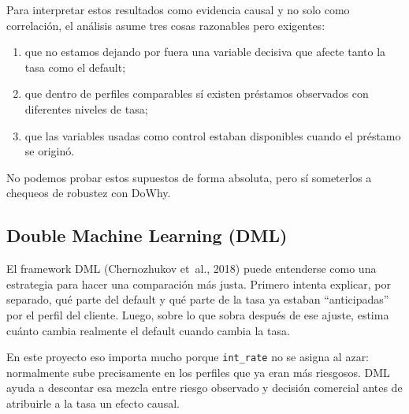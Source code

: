 \documentclass[
  spanish,
  11pt,
  letterpaper,
]{scrbook}
\providecommand{\tightlist}{%
  \setlength{\itemsep}{0pt}\setlength{\parskip}{0pt}}
\theoremstyle{plain}
\theoremstyle{remark}
\begin{document}
\begin{tcolorbox}[enhanced jigsaw, arc=.35mm, bottomrule=.15mm, bottomtitle=1mm, breakable, colback=white, colbacktitle=quarto-callout-note-color!10!white, colframe=quarto-callout-note-color-frame, coltitle=black, left=2mm, leftrule=.75mm, opacityback=0, opacitybacktitle=0.6, rightrule=.15mm, title=\textcolor{quarto-callout-note-color}{\faInfo}\hspace{0.5em}{Qué necesitamos asumir para leer esto como causalidad}, titlerule=0mm, toprule=.15mm, toptitle=1mm]

Para interpretar estos resultados como evidencia causal y no solo como
correlación, el análisis asume tres cosas razonables pero exigentes:

\begin{enumerate}
\def\labelenumi{\arabic{enumi}.}
\tightlist
\item
  que no estamos dejando por fuera una variable decisiva que afecte
  tanto la tasa como el default;
\item
  que dentro de perfiles comparables sí existen préstamos observados con
  diferentes niveles de tasa;
\item
  que las variables usadas como control estaban disponibles cuando el
  préstamo se originó.
\end{enumerate}

No podemos probar estos supuestos de forma absoluta, pero sí someterlos
a chequeos de robustez con DoWhy.

\end{tcolorbox}

\subsection{Double Machine Learning
(DML)}\label{double-machine-learning-dml}

El framework DML ({Chernozhukov et~al.}, 2018) puede entenderse como una
estrategia para hacer una comparación más justa. Primero intenta
explicar, por separado, qué parte del default y qué parte de la tasa ya
estaban ``anticipadas'' por el perfil del cliente. Luego, sobre lo que
sobra después de ese ajuste, estima cuánto cambia realmente el default
cuando cambia la tasa.

En este proyecto eso importa mucho porque \texttt{int\_rate} no se
asigna al azar: normalmente sube precisamente en los perfiles que ya
eran más riesgosos. DML ayuda a descontar esa mezcla entre riesgo
observado y decisión comercial antes de atribuirle a la tasa un efecto
causal.
\end{document}
